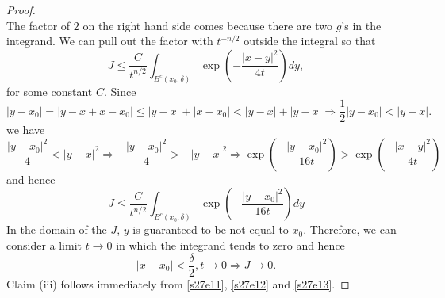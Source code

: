 \documentclass{article}
\theoremstyle{plain}
\numberwithin{thm}{section}
\theoremstyle{plain}
\numberwithin{prop}{section}
\theoremstyle{definition}
\numberwithin{defn}{section}
\theoremstyle{remark}
\numberwithin{equation}{section}
\begin{document}
\begin{proof}
\[\]
The factor of $2$ on the right hand side comes because there are two $g$'s in the integrand. We can pull out the
factor with $t^{-n/2}$ outside the integral so that
\[
J \le \frac{C}{t^{n/2}}\int_{B^c(x_0, \delta)}\exp\left(-\frac{|x - y|^2}{4t}\right)dy,
\]
for some constant $C$. Since
\[
|y - x_0| = |y - x + x - x_0| \le |y - x| + |x - x_0| < |y - x| + |y - x| \Rightarrow \frac{1}{2}|y-x_0| < |y-x|.
\]
we have
\[
\frac{|y - x_0|^2}{4} < |y - x|^2 \Rightarrow -\frac{|y - x_0|^2}{4} > -|y - x|^2 \Rightarrow
\exp\left(-\frac{|y - x_0|^2}{16t}\right) > \exp\left(-\frac{|x - y|^2}{4t}\right)
\]
and hence
\[
J \le \frac{C}{t^{n/2}}\int_{B^c(x_0, \delta)}\exp\left(-\frac{|y - x_0|^2}{16t}\right)dy
\]
In the domain of the $J$, $y$ is guaranteed to be not equal to $x_0$. Therefore, we can consider a limit $t 
\rightarrow 0$ in which the integrand tends to zero and hence
\begin{equation}\label{s27e13}
|x - x_0| < \frac{\delta}{2}, t \rightarrow 0 \Rightarrow J \rightarrow 0.
\end{equation}
Claim (iii) follows immediately from \eqref{s27e11}, \eqref{s27e12} and \eqref{s27e13}.
\end{proof}
\end{document}
